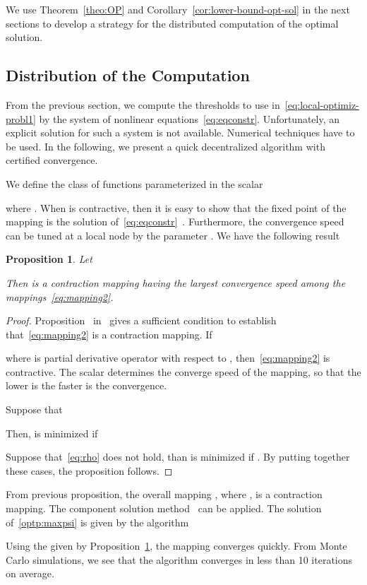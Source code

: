 \documentclass[a4paper,notitlepage,onecolumn]{article}
\newtheorem{proposition}[theorem]{Proposition}
\numberwithin{equation}{section}
\begin{document}
We use Theorem~\ref{theo:OP} and
Corollary~\ref{cor:lower-bound-opt-sol} in the next sections to
develop a strategy for the distributed computation of the optimal
solution.

\subsection{Distribution of the Computation}

From the previous section, we compute the thresholds to use
in~\eqref{eq:local-optimiz-probl1} by the system of nonlinear
equations~\eqref{eq:eqconstr}. Unfortunately, an explicit solution
for such a system is not available. Numerical techniques have to
be used. In the following, we present a quick decentralized
algorithm with certified convergence.

We define the class of functions parameterized in the scalar


where .
When  is contractive, then it is easy to show that the fixed point of the mapping is the solution of~\eqref{eq:eqconstr}~\cite[Pag.191]{tsi}.  Furthermore, the convergence speed can be tuned at a local node  by the parameter . We have the following result
\begin{proposition} \label{prop:fastcontrmapping}
Let

Then  is a contraction mapping having the largest convergence
speed among the mappings~\eqref{eq:mapping2}.
\end{proposition}

\begin{proof}
Proposition~ in~\cite[Pag.193]{tsi} gives a sufficient
condition to establish that~\eqref{eq:mapping2} is a contraction
mapping. If

where  is partial derivative operator with respect to
, then~\eqref{eq:mapping2} is contractive. The scalar
 determines the converge speed of the mapping, so
that the lower is  the faster is the convergence.

Suppose that

Then,  is minimized if

Suppose that~\eqref{eq:rho} does not hold, than  is minimized if . By putting together these cases, the proposition follows.
\end{proof}
From previous proposition, the overall mapping ,
where , is a contraction mapping. The component solution method~\cite[Pag.187]{tsi} can be applied.
The solution of~\eqref{optp:maxpsi} is given by the algorithm

Using the  given by Proposition~\ref{prop:fastcontrmapping}, the mapping converges quickly. From Monte Carlo simulations, we see that the algorithm converges in less than 10 iterations on average.
\end{document}
